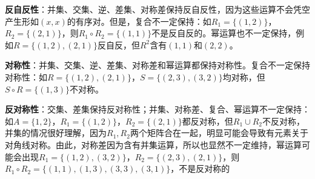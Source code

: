 \textbf{反自反性}：并集、交集、逆、差集、对称差保持反自反性，因为这些运算不会凭空产生形如$(x,x)$的有序对。但是，复合不一定保持：如$R_1 = \{(1,2)\}$，$R_2 = \{(2,1)\}$，则$R_1 \circ R_2 = \{(1,1)\}$不是反自反的。幂运算也不一定保持，例如$R=\{(1,2),(2,1)\}$反自反，但$R^2$含有$(1,1)$和$(2,2)$。

\textbf{对称性}：并集、交集、逆、差集、对称差和幂运算都保持对称性。复合不一定保持对称性：如$R = \{(1,2),(2,1)\}$，$S=\{(2,3),(3,2)\}$均对称，但$S\circ R=\{(1,3)\}$不对称。

\textbf{反对称性}：交集、差集保持反对称性；并集、对称差、复合、幂运算不一定保持：如$A = \{1,2\}$，$R_1 = \{(1,2)\}$，$R_2 = \{(2,1)\}$都反对称，但$R_1 \cup R_2$不反对称，并集的情况很好理解，因为$R_1,R_2$两个矩阵合在一起，明显可能会导致有元素关于对角线对称。由此，对称差因为含有并集运算，所以也显然不一定维持，幂运算可能会出现$R_1 = \{(1,2),(3,2)\}$，$R_2 = \{(2,3),(2,1)\}$，则$R_1 \circ R_2 = \{(1,1),(1,3),(3,3),(3,1)\}$，不是反对称的

